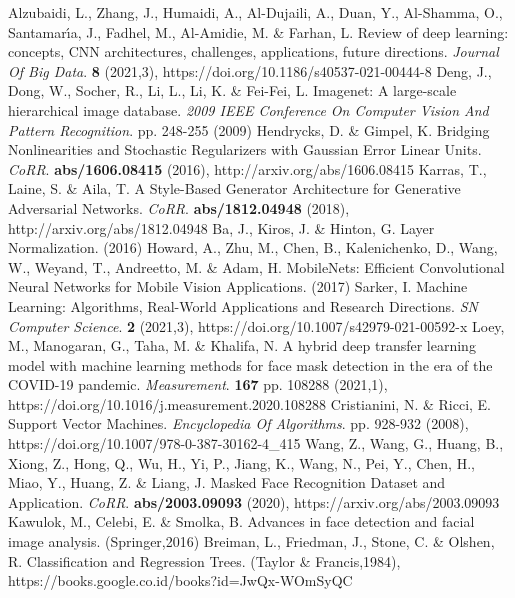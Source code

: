 \documentclass{article}
\begin{document}
\begin{thebibliography}{1}
	Alzubaidi, L., Zhang, J., Humaidi, A., Al-Dujaili, A., Duan, Y., Al-Shamma, O., Santamarı́a, J., Fadhel, M., Al-Amidie, M. \& Farhan, L. Review of deep learning: concepts, CNN architectures, challenges, applications, future directions. {\em Journal Of Big Data}. \textbf{8} (2021,3), https://doi.org/10.1186/s40537-021-00444-8
	Deng, J., Dong, W., Socher, R., Li, L., Li, K. \& Fei-Fei, L. Imagenet: A large-scale hierarchical image database. {\em 2009 IEEE Conference On Computer Vision And Pattern Recognition}. pp. 248-255 (2009)
	Hendrycks, D. \& Gimpel, K. Bridging Nonlinearities and Stochastic Regularizers with Gaussian Error Linear Units. {\em CoRR}. \textbf{abs/1606.08415} (2016), http://arxiv.org/abs/1606.08415
	Karras, T., Laine, S. \& Aila, T. A Style-Based Generator Architecture for Generative Adversarial Networks. {\em CoRR}. \textbf{abs/1812.04948} (2018), http://arxiv.org/abs/1812.04948
	Ba, J., Kiros, J. \& Hinton, G. Layer Normalization.  (2016)
	Howard, A., Zhu, M., Chen, B., Kalenichenko, D., Wang, W., Weyand, T., Andreetto, M. \& Adam, H. MobileNets: Efficient Convolutional Neural Networks for Mobile Vision Applications.  (2017)
	Sarker, I. Machine Learning: Algorithms, Real-World Applications and Research Directions. {\em SN Computer Science}. \textbf{2} (2021,3), https://doi.org/10.1007/s42979-021-00592-x
	Loey, M., Manogaran, G., Taha, M. \& Khalifa, N. A hybrid deep transfer learning model with machine learning methods for face mask detection in the era of the COVID-19 pandemic. {\em Measurement}. \textbf{167} pp. 108288 (2021,1), https://doi.org/10.1016/j.measurement.2020.108288
	Cristianini, N. \& Ricci, E. Support Vector Machines. {\em Encyclopedia Of Algorithms}. pp. 928-932 (2008), https://doi.org/10.1007/978-0-387-30162-4_415
	Wang, Z., Wang, G., Huang, B., Xiong, Z., Hong, Q., Wu, H., Yi, P., Jiang, K., Wang, N., Pei, Y., Chen, H., Miao, Y., Huang, Z. \& Liang, J. Masked Face Recognition Dataset and Application. {\em CoRR}. \textbf{abs/2003.09093} (2020), https://arxiv.org/abs/2003.09093
	Kawulok, M., Celebi, E. \& Smolka, B. Advances in face detection and facial image analysis. (Springer,2016)
	Breiman, L., Friedman, J., Stone, C. \& Olshen, R. Classification and Regression Trees. (Taylor & Francis,1984), https://books.google.co.id/books?id=JwQx-WOmSyQC

\end{thebibliography}
\end{document}
